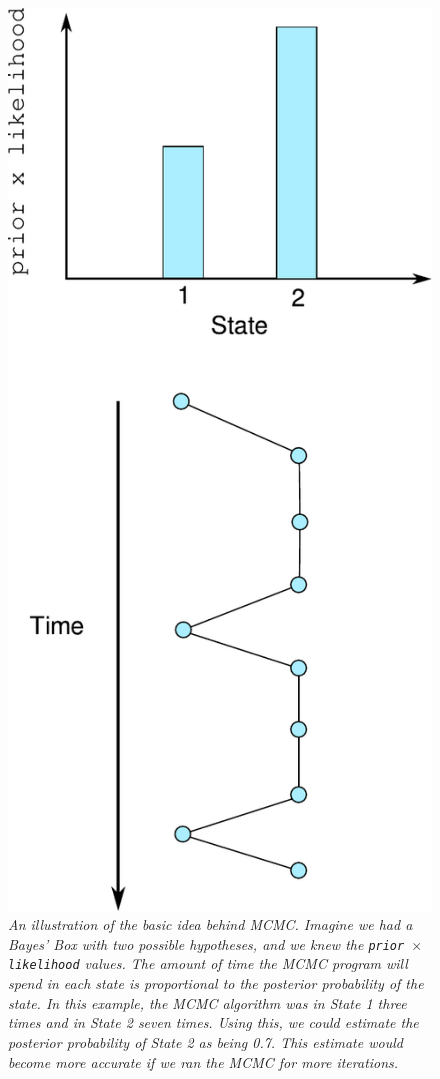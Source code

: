 \begin{figure}[!ht]
\begin{center}
\includegraphics[scale=0.65]{Figures/mcmc.pdf}
\caption{\it An illustration of the basic idea behind MCMC. Imagine we had a
Bayes' Box with two possible hypotheses, and we knew the
{\tt prior $\times$ likelihood} values. The amount of time the MCMC program will
spend in each state is proportional to the posterior probability of the state.
In this example, the MCMC algorithm was in State 1 three times and in State 2
seven times. Using this, we could estimate the posterior probability of State 2
as being 0.7. This estimate would become more accurate if we ran the MCMC for
more iterations.\label{fig:mcmc}}
\end{center}
\end{figure}

